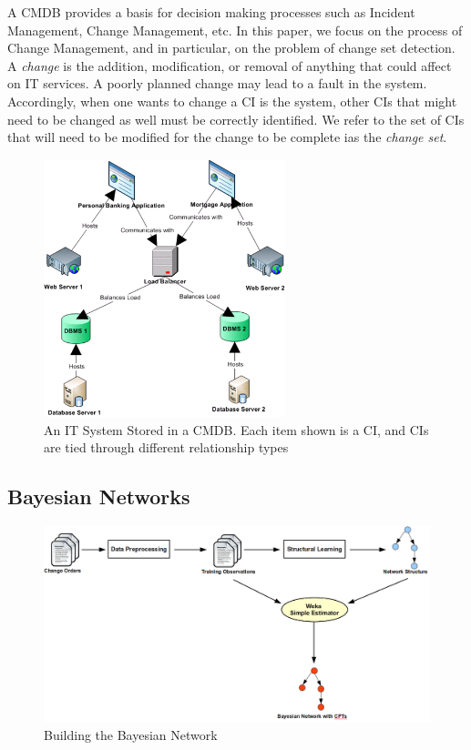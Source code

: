 \documentclass[10pt,twocolumn,letterpaper]{article}
\begin{document}
A CMDB provides a basis for decision making processes such as Incident Management, Change Management, etc.  In this paper, we focus on the process of Change
Management, and in particular, on the problem of change set detection. A \textit{change} is the addition, modification, or removal of anything that could affect
on IT services. A poorly planned change may lead to a fault in the system. Accordingly, when one wants to change a CI is the system, other CIs that might
need to be changed as well must be correctly identified. We refer to the set of CIs that will need to be modified for the change to be complete ias the
\textit{change set}.

\begin{figure}[!t]
\centering
\includegraphics[width=7cm]{cmdbExample.PNG}
\caption{An IT System Stored in a CMDB. Each item shown is a CI, and CIs are tied through different relationship types}
\label{fig:cmdbExample}
\end{figure}

\subsection{Bayesian Networks}

\begin{figure}[!t]
\centering
\includegraphics[width=15cm]{graphics/constructingmodel.png}
\caption{Building the Bayesian Network}
\label{fig:process}
\end{figure}
\end{document}
